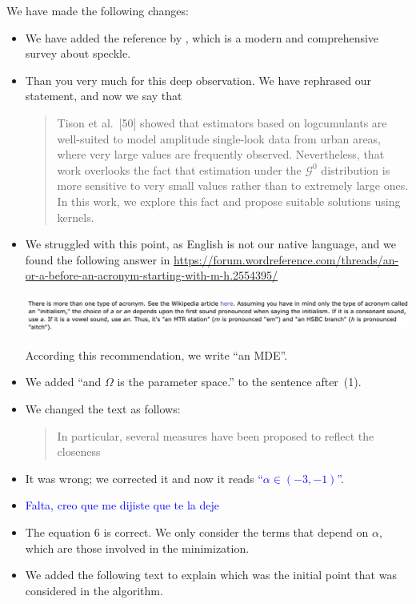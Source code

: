 \documentclass{ar2rc}
\begin{document}
\AR We have made the following changes:
\begin{itemize}
\item We have added the reference by \citet{SARImageStatisticalModelingPartISinglePixelStatisticalModels}, which is a modern and comprehensive survey about speckle.
\item Than you very much for this deep observation. We have rephrased our statement, and now we say that
	\begin{quote}
		Tison et al.~[50] showed that estimators based on logcumulants 
		are well-suited to model amplitude single-look data from urban areas, where very large values are frequently observed.
		Nevertheless, that work overlooks the fact that estimation under the $\mathcal G^0$ distribution is more sensitive to very small values rather than to extremely large ones.
		In this work, we explore this fact and propose suitable solutions using kernels.
	\end{quote}
\item We struggled with this point, as English is not our native language, and we found the following answer in \url{https://forum.wordreference.com/threads/an-or-a-before-an-acronym-starting-with-m-h.2554395/}
\begin{center}
	\includegraphics[width=\linewidth]{AorAN.png}
\end{center}
According this recommendation, we write ``an MDE''.
\item We added ``and $\Omega$ is the parameter space.'' to the sentence after~(1).
\item We changed the text as follows:
		\begin{quote}
	In particular, several measures have been proposed to reflect the closeness  \DIFdelbegin {} \DIFdelend \DIFaddbegin {}\DIFaddend
		\end{quote}
\item It was wrong; we corrected it and now it reads \textcolor{blue}{``$\alpha \in (-3,-1)$''}.
\item \textcolor{blue}{Falta, creo que me dijiste que te la deje}
\item The equation $6$ is correct. We only consider the terms that depend on $\alpha$, which are those involved in the minimization.
\item We added the following text to explain which was the initial point that was considered in the algorithm.

\end{itemize}
\end{document}
